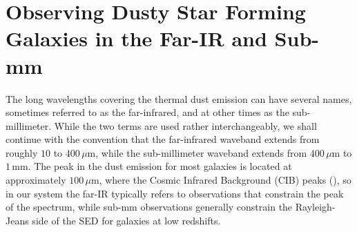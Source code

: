 \section{Observing Dusty Star Forming Galaxies in the Far-IR and Sub-mm}

The long wavelengths covering the thermal dust emission can have several names, sometimes referred to as the far-infrared, and at other times as the sub-millimeter. While the two terms are used rather interchangeably, we shall continue with the convention that the far-infrared waveband extends from roughly $10$ to $400\,\mu$m, while the sub-millimeter waveband extends from $400\,\mu$m to $1\,$mm. The peak in the dust emission for most galaxies is located at approximately $100\,\mu$m, where the Cosmic Infrared Background (CIB) peaks (\citealt{Yan_2022}), so in our system the far-IR typically refers to observations that constrain the peak of the spectrum, while sub-mm observations generally constrain the Rayleigh-Jeans side of the SED for galaxies at low redshifts.

